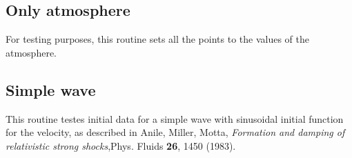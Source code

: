 \documentclass{article}
\begin{document}
%
%
%

\subsection{Only atmosphere}
\label{sec:only-atmo}

For testing purposes, this routine sets all the points to the values of the atmosphere.


\subsection{Simple wave}
\label{sec:simple-wave}

This routine testes initial data for a simple wave with sinusoidal initial function for the velocity,
as described in Anile, Miller, Motta, {\it Formation and damping of relativistic strong
  shocks},Phys. Fluids {\bf 26}, 1450 (1983).
\end{document}

